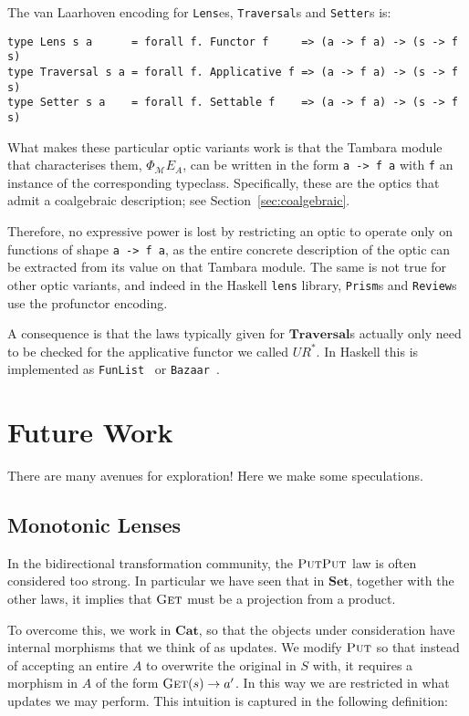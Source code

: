 \documentclass[11pt,letterpaper]{article}
\theoremstyle{plain}
\theoremstyle{definition}
\newcommand{\M}{\mathscr{M}}
\newcommand{\lenslib}{\texttt{lens}}
\newcommand{\Pastro}{\Phi}
\newcommand{\Set}{\mathbf{Set}}
\newcommand{\Cat}{\mathbf{Cat}}
\newcommand{\Traversal}{\mathbf{Traversal}}
\newcommand{\fget}{\textsc{Get}}
\newcommand{\fput}{\textsc{Put}}
\begin{document}
The van Laarhoven encoding for \texttt{Lens}es, \texttt{Traversal}s and \texttt{Setter}s is:
\begin{verbatim}
type Lens s a      = forall f. Functor f     => (a -> f a) -> (s -> f s)
type Traversal s a = forall f. Applicative f => (a -> f a) -> (s -> f s)
type Setter s a    = forall f. Settable f    => (a -> f a) -> (s -> f s)
\end{verbatim}
What makes these particular optic variants work is that the Tambara module that characterises them, $\Pastro_\M E_A$, can be written in the form \texttt{a -> f a} with \texttt{f} an instance of the corresponding typeclass. Specifically, these are the optics that admit a coalgebraic description; see Section~\ref{sec:coalgebraic}.

Therefore, no expressive power is lost by restricting an optic to operate only on functions of shape \texttt{a -> f a}, as the entire concrete description of the optic can be extracted from its value on that Tambara module. The same is not true for other optic variants, and indeed in the Haskell \lenslib{} library, \texttt{Prism}s and \texttt{Review}s use the profunctor encoding.

A consequence is that the laws typically given for $\Traversal$s actually only need to be checked for the applicative functor we called $UR^*$. In Haskell this is implemented as \texttt{FunList}~\cite{FunListPost} or \texttt{Bazaar}~\cite{LensLibrary}.

\section{Future Work}

There are many avenues for exploration! Here we make some speculations.

\subsection{Monotonic Lenses}
In the bidirectional transformation community, the $\fput\fput$ law is often considered too strong. In particular we have seen that in $\Set$, together with the other laws, it implies that $\fget$ must be a projection from a product.

To overcome this, we work in $\Cat$, so that the objects under consideration have internal morphisms that we think of as updates. We modify $\fput$ so that instead of accepting an entire $A$ to overwrite the original in $S$ with, it requires a morphism in $A$ of the form $\fget(s) \to a'$. In this way we are restricted in what updates we may perform. This intuition is captured in the following definition:
\end{document}
